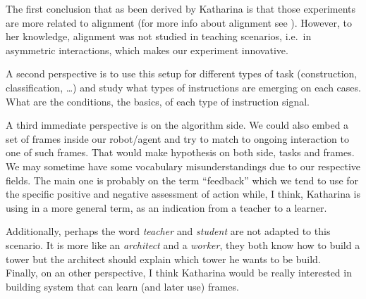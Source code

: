 The first conclusion that as been derived by Katharina is that those experiments are more related to alignment (for more info about alignment see \cite{pickering2004toward}). However, to her knowledge, alignment was not studied in teaching scenarios, i.e.\ in asymmetric interactions, which makes our experiment innovative.

A second perspective is to use this setup for different types of task (construction, classification, \ldots) and study what types of instructions are emerging on each cases. What are the conditions, the basics, of each type of instruction signal. 

A third immediate perspective is on the algorithm side. We could also embed a set of frames inside our robot/agent and try to match to ongoing interaction to one of such frames. That would make hypothesis on both side, tasks and frames. 
\\

We may sometime have some vocabulary misunderstandings due to our respective fields.  The main one is probably on the term ``feedback'' which we tend to use for the specific positive and negative assessment of action while, I think, Katharina is using in a more general term, as an indication from a teacher to a learner.

Additionally, perhaps the word \emph{teacher} and \emph{student} are not adapted to this scenario. It is more like an \emph{architect} and a \emph{worker}, they both know how to build a tower but the architect should explain which tower he wants to be build.
\\

Finally, on an other perspective, I think Katharina would be really interested in building system that can learn (and later use) frames.
